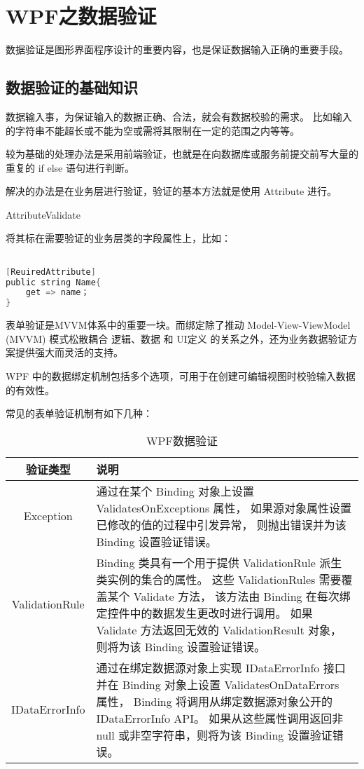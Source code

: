 ﻿%

\chapter{WPF之数据验证}

数据验证是图形界面程序设计的重要内容，也是保证数据输入正确的重要手段。

 \section{数据验证的基础知识}
数据输入事，为保证输入的数据正确、合法，就会有数据校验的需求。
比如输入的字符串不能超长或不能为空或需将其限制在一定的范围之内等等。

较为基础的处理办法是采用前端验证，也就是在向数据库或服务前提交前写大量的重复的 if else 语句进行判断。

解决的办法是在业务层进行验证，验证的基本方法就是使用 Attribute 进行。

AttributeValidate

将其标在需要验证的业务层类的字段属性上，比如：

\begin{lstlisting}[language=C]

[ReuiredAttribute]
public string Name{
    get => name；
}

\end{lstlisting}

表单验证是MVVM体系中的重要一块。而绑定除了推动 Model-View-ViewModel (MVVM) 模式松散耦合 逻辑、数据 和 UI定义 的关系之外，还为业务数据验证方案提供强大而灵活的支持。

WPF 中的数据绑定机制包括多个选项，可用于在创建可编辑视图时校验输入数据的有效性。

常见的表单验证机制有如下几种：
\begin{table}[h]
\centering
\caption{WPF数据验证}\label{tab:wpfdatavalidate}
\begin{tabular}{cp{11.2cm}}
\hline
验证类型  &   说明 \\
\hline
Exception           &   通过在某个 Binding 对象上设置 ValidatesOnExceptions 属性，
                                如果源对象属性设置已修改的值的过程中引发异常，
                                则抛出错误并为该 Binding 设置验证错误。 \\
ValidationRule   &   Binding 类具有一个用于提供 ValidationRule 派生类实例的集合的属性。
                                这些 ValidationRules 需要覆盖某个 Validate 方法，
                                该方法由 Binding 在每次绑定控件中的数据发生更改时进行调用。
                                如果 Validate 方法返回无效的 ValidationResult 对象，
                                则将为该 Binding 设置验证错误。 \\
IDataErrorInfo    &  通过在绑定数据源对象上实现 IDataErrorInfo 接口并在 Binding 对象上设置 ValidatesOnDataErrors 属性，
                                Binding 将调用从绑定数据源对象公开的 IDataErrorInfo API。
                                如果从这些属性调用返回非 null 或非空字符串，则将为该 Binding 设置验证错误。 \\
\hline
\end{tabular}
\end{table}

